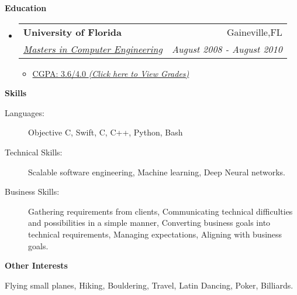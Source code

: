 \documentclass[letterpaper,11pt]{article}
\makeatletter
\newcommand{\resitem}[1]{\item #1 \vspace{-2pt}}
\newcommand{\resheading}[1]{{\large \colorbox{mygrey}{\begin{minipage}{\textwidth}{\textbf{#1 \vphantom{p\^{E}}}}\end{minipage}}}}
\newcommand{\ressubheading}[4]{
\begin{tabular*}{7.0in}{l@{\extracolsep{\fill}}r}
    \textbf{#1} & #2 \\
    \textit{#3} & \textit{#4} \\
\end{tabular*}\vspace{-6pt}}
\makeatother
\begin{document}
  
\resheading{Education}
\begin{itemize}
\item
    \ressubheading{University of Florida}{Gaineville,FL}{\href{http://dl.dropbox.com/u/23360122/UF_Grades.pdf}{Masters in Computer Engineering}}{August 2008 - August 2010}
    \begin{itemize}
        \resitem{\href{https://dl.dropboxusercontent.com/u/23360122/UF_GRADES.pdf}{CGPA: 3.6/4.0 \emph{(Click here to View Grades)}}}
    \end{itemize}
\end{itemize}


\resheading{Skills}
\begin{description}
\item[Languages:]
Objective C, Swift, C, C++, Python, Bash
\item[Technical Skills:]
Scalable software engineering, Machine learning, Deep Neural networks.
\item[Business Skills:]
Gathering requirements from clients, Communicating technical difficulties and possibilities in a simple manner, Converting business goals into technical requirements, Managing expectations, Aligning with business goals.
\end{description}


\resheading{Other Interests}
\begin{description}
\item Flying small planes, Hiking, Bouldering, Travel, Latin Dancing, Poker, Billiards.
\end{description}
\end{document}
